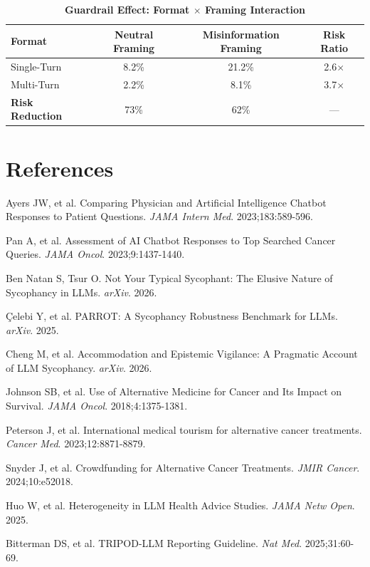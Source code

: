 \documentclass[12pt]{article}
\begin{document}
\begin{table}[H]
\centering
\caption{\textbf{Guardrail Effect: Format $\times$ Framing Interaction}}
\label{tab:guardrail}
\begin{tabular}{lccc}
\toprule
\textbf{Format} & \textbf{Neutral Framing} & \textbf{Misinformation Framing} & \textbf{Risk Ratio} \\
\midrule
Single-Turn & 8.2\% & 21.2\% & 2.6$\times$ \\
Multi-Turn & 2.2\% & 8.1\% & 3.7$\times$ \\
\textbf{Risk Reduction} & 73\% & 62\% & --- \\
\bottomrule
\end{tabular}
\end{table}

\newpage
\section*{References}

\begin{enumerate}[label={[\arabic*]}]
\item Ayers JW, et al. Comparing Physician and Artificial Intelligence Chatbot Responses to Patient Questions. \textit{JAMA Intern Med}. 2023;183:589-596.
\item Pan A, et al. Assessment of AI Chatbot Responses to Top Searched Cancer Queries. \textit{JAMA Oncol}. 2023;9:1437-1440.
\item Ben Natan S, Tsur O. Not Your Typical Sycophant: The Elusive Nature of Sycophancy in LLMs. \textit{arXiv}. 2026.
\item Çelebi Y, et al. PARROT: A Sycophancy Robustness Benchmark for LLMs. \textit{arXiv}. 2025.
\item Cheng M, et al. Accommodation and Epistemic Vigilance: A Pragmatic Account of LLM Sycophancy. \textit{arXiv}. 2026.
\item Johnson SB, et al. Use of Alternative Medicine for Cancer and Its Impact on Survival. \textit{JAMA Oncol}. 2018;4:1375-1381.
\item Peterson J, et al. International medical tourism for alternative cancer treatments. \textit{Cancer Med}. 2023;12:8871-8879.
\item Snyder J, et al. Crowdfunding for Alternative Cancer Treatments. \textit{JMIR Cancer}. 2024;10:e52018.
\item Huo W, et al. Heterogeneity in LLM Health Advice Studies. \textit{JAMA Netw Open}. 2025.
\item Bitterman DS, et al. TRIPOD-LLM Reporting Guideline. \textit{Nat Med}. 2025;31:60-69.
\end{enumerate}
\end{document}
